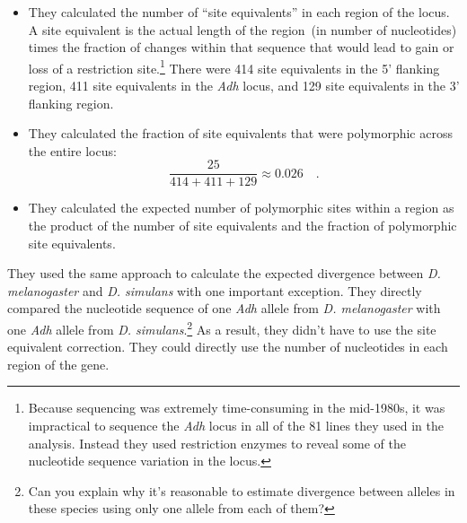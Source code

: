 \begin{itemize}

\item They calculated the number of ``site equivalents'' in each
  region of the locus. A site equivalent is the actual length of the
  region~(in number of nucleotides) times the fraction of changes
  within that sequence that would lead to gain or loss of a
  restriction site.\footnote{Because sequencing was extremely
    time-consuming in the mid-1980s, it was impractical to sequence
    the {\it Adh\/} locus in all of the 81 lines they used in the
    analysis. Instead they used restriction enzymes to reveal some of
    the nucleotide sequence variation in the locus.} There were 414
  site equivalents in the 5' flanking region, 411 site equivalents in
  the {\it Adh\/} locus, and 129 site equivalents in the 3' flanking
  region.

\item They calculated the fraction of site equivalents that were
  polymorphic across the entire locus:
\[
\frac{25}{414+411+129} \approx 0.026 \quad .
\]

\item They calculated the expected number of polymorphic sites within
  a region as the product of the number of site equivalents and the
  fraction of polymorphic site equivalents.

\end{itemize}

\noindent They used the same approach to calculate the expected
divergence between {\it D. melanogaster\/} and {\it D. simulans\/}
with one important exception. They directly compared the nucleotide
sequence of one {\it Adh\/} allele from {\it D. melanogaster\/} with
one {\it Adh\/} allele from {\it D. simulans}.\footnote{Can you
  explain why it's reasonable to estimate divergence between alleles
  in these species using only one allele from each of them?} As a
result, they didn't have to use the site equivalent correction. They
could directly use the number of nucleotides in each region of the
gene.

